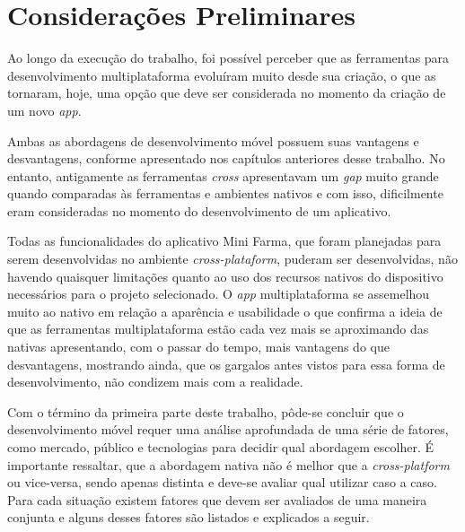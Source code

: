 \chapter{Considerações Preliminares} \label{cap:consideracoespreliminares}

Ao longo da execução do trabalho, foi possível perceber que as ferramentas para desenvolvimento multiplataforma 
evoluíram muito desde sua criação, o que as tornaram, hoje, uma opção que deve ser considerada no momento da criação de um novo \textit{app}.

Ambas as abordagens de desenvolvimento móvel possuem suas vantagens e desvantagens, conforme apresentado nos capítulos anteriores desse trabalho. 
No entanto, antigamente as ferramentas \textit{cross} apresentavam um \textit{gap} muito grande quando comparadas às ferramentas e ambientes nativos e com isso, 
dificilmente eram consideradas no momento do desenvolvimento de um aplicativo.

Todas as funcionalidades do aplicativo Mini Farma, que foram planejadas para serem desenvolvidas no ambiente \textit{cross-plataform}, puderam ser desenvolvidas, não havendo quaisquer limitações 
quanto ao uso dos recursos nativos do dispositivo necessários para o projeto selecionado. O \textit{app} multiplataforma se assemelhou muito 
ao nativo em relação a aparência e usabilidade o que confirma a ideia de que as ferramentas multiplataforma estão cada vez mais se aproximando
das nativas apresentando, com o passar do tempo, mais vantagens do que desvantagens, mostrando ainda, que os gargalos antes vistos para essa forma de desenvolvimento, não condizem
mais com a realidade.

Com o término da primeira parte deste trabalho, pôde-se concluir que o desenvolvimento móvel requer uma análise aprofundada de uma série de fatores, 
como mercado, público e tecnologias para decidir qual abordagem escolher.
É importante ressaltar, que a abordagem nativa não é melhor que a \textit{cross-platform} ou vice-versa, sendo apenas distinta e deve-se avaliar qual utilizar caso a 
caso. Para cada situação existem fatores que devem ser avaliados de uma maneira conjunta e alguns desses fatores são listados e explicados a seguir.

